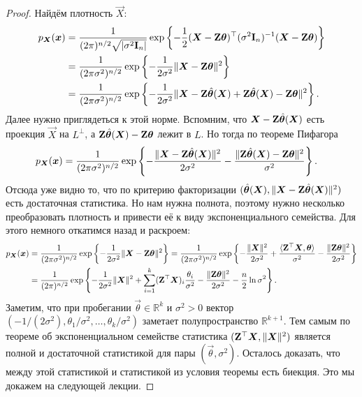 \begin{proof}
	Найдём плотность $\vec{X}$:
	\begin{align*}
		p_{\bm{X}}(\bm{x})
		&= \frac{1}{(2\pi)^{n/2}\sqrt{|\sigma^{2}\mathbf{I}_{n}|}}\exp\left\{-\frac{1}{2}(\bm{X} - \mathbf{Z}\bm{\theta})^{\top}(\sigma^{2}\mathbf{I}_{n})^{-1}(\bm{X} - \mathbf{Z}\bm{\theta})\right\} \\
		&= \frac{1}{(2\pi\sigma^{2})^{n/2}}\exp\left\{-\frac{1}{2\sigma^{2}}\|\bm{X} - \mathbf{Z}\bm{\theta}\|^{2}\right\} \\
		&= \frac{1}{(2\pi\sigma^{2})^{n/2}}\exp\left\{-\frac{1}{2\sigma^{2}}\|\bm{X} - \mathbf{Z}\hat{\bm{\theta}}(\bm{X}) + \mathbf{Z}\hat{\bm{\theta}}(\bm{X}) - \mathbf{Z}\bm{\theta}\|^{2}\right\}.
	\end{align*}
	Далее нужно приглядеться к этой норме. Вспомним, что $\bm{X} - \mathbf{Z}\hat{\bm{\theta}}(\bm{X})$ есть проекция $\vec{X}$ на $L^{\perp}$, а $\mathbf{Z}\hat{\bm{\theta}}(\bm{X}) - \mathbf{Z}\bm{\theta}$ лежит в $L$. Но тогда по теореме Пифагора
	\begin{align*}
		p_{\bm{X}}(\bm{x})
		&= \frac{1}{(2\pi\sigma^{2})^{n/2}}\exp\left\{-\frac{\|\bm{X} - \mathbf{Z}\hat{\bm{\theta}}(\bm{X})\|^{2}}{2\sigma^{2}} - \frac{\|\mathbf{Z}\hat{\bm{\theta}}(\bm{X}) - \mathbf{Z}\bm{\theta}\|^{2}}{\sigma^{2}}\right\}.
	\end{align*}
	Отсюда уже видно то, что по критерию факторизации $(\hat{\bm{\theta}}(\bm{X}), \|\bm{X} - \mathbf{Z}\hat{\bm{\theta}}(\bm{X})\|^{2})$ есть достаточная статистика. Но нам нужна полнота, поэтому нужно несколько преобразовать плотность и привести её к виду экспоненциального семейства. Для этого немного откатимся назад и раскроем:
	\begin{align*}
		p_{\bm{X}}(\bm{x})
		&= \frac{1}{(2\pi\sigma^{2})^{n/2}}\exp\left\{-\frac{1}{2\sigma^{2}}\|\bm{X} - \mathbf{Z}\bm{\theta}\|^{2}\right\}
		= \frac{1}{(2\pi\sigma^{2})^{n/2}}\exp\left\{-\frac{\|\bm{X}\|^{2}}{2\sigma^{2}} + \frac{\langle \mathbf{Z}^{\top}\bm{X}, \bm{\theta} \rangle}{\sigma^{2}} - \frac{\|\mathbf{Z}\bm{\theta}\|^{2}}{2\sigma^{2}}\right\} \\
		&= \frac{1}{(2\pi)^{n/2}}\exp\left\{-\frac{1}{2\sigma^{2}}\|\bm{X}\|^{2} + \sum_{i = 1}^{k} (\mathbf{Z}^{\top}\bm{X})_{i}\frac{\theta_{i}}{\sigma^{2}} - \frac{\|\mathbf{Z}\bm{\theta}\|^{2}}{2\sigma^{2}} - \frac{n}{2}\ln \sigma^{2}\right\}.
	\end{align*}
	Заметим, что при пробегании $\vec{\theta} \in \mathbb{R}^{k}$ и $\sigma^{2} > 0$ вектор $(-1/(2\sigma^{2}), \theta_{1}/\sigma^{2}, \ldots, \theta_{k}/\sigma^{2})$ заметает полупространство $\mathbb{R}^{k + 1}$. Тем самым по теореме об экспоненциальном семействе статистика $(\mathbf{Z}^{\top}\bm{X}, \|\bm{X}\|^{2})$ является полной и достаточной статистикой для пары $(\vec{\theta}, \sigma^{2})$. Осталось доказать, что между этой статистикой и статистикой из условия теоремы есть биекция. Это мы докажем на следующей лекции.
\end{proof}
